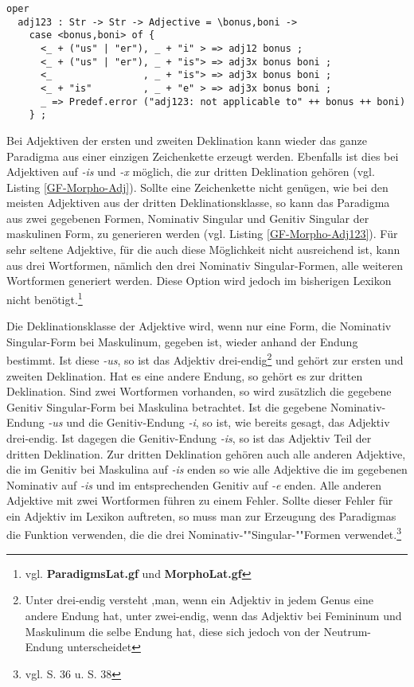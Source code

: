 \begin{lstlisting}[float=h!tp,caption={Smart Paradigm für zwei Adjektivformen (vgl. \textbf{MorphoLat.gf})},label={GF-Morpho-Adj123},basicstyle=\small]
oper
  adj123 : Str -> Str -> Adjective = \bonus,boni ->
    case <bonus,boni> of {
      <_ + ("us" | "er"), _ + "i" > => adj12 bonus ;
      <_ + ("us" | "er"), _ + "is"> => adj3x bonus boni ;
      <_                , _ + "is"> => adj3x bonus boni ;
      <_ + "is"         , _ + "e" > => adj3x bonus boni ;
      _ => Predef.error ("adj123: not applicable to" ++ bonus ++ boni)
    } ;
\end{lstlisting}
Bei Adjektiven der ersten und zweiten Deklination kann wieder das ganze Paradigma aus einer einzigen Zeichenkette erzeugt werden. Ebenfalls ist dies bei Adjektiven auf \textit{-is} und \textit{-x} möglich, die zur dritten Deklination gehören (vgl. Listing \ref{GF-Morpho-Adj}). Sollte eine Zeichenkette nicht genügen, wie bei den meisten Adjektiven aus der dritten Deklinationsklasse, so kann das Paradigma aus zwei gegebenen Formen, Nominativ Singular und Genitiv Singular der maskulinen Form, zu generieren werden (vgl. Listing \ref{GF-Morpho-Adj123}). Für sehr seltene Adjektive, für die auch diese Möglichkeit nicht ausreichend ist, kann aus drei Wortformen, nämlich den drei Nominativ Singular-Formen, alle weiteren Wortformen generiert werden. Diese Option wird jedoch im bisherigen Lexikon nicht benötigt.\footnote{vgl. \textbf{ParadigmsLat.gf} und \textbf{MorphoLat.gf}} \par
Die Deklinationsklasse der Adjektive wird, wenn nur eine Form, die Nominativ Singular-Form bei Maskulinum, gegeben ist, wieder anhand der Endung bestimmt. Ist diese \textit{-us}, so ist das Adjektiv drei-endig\footnote{Unter drei-endig versteht ,man, wenn ein Adjektiv in jedem Genus eine andere Endung hat, unter zwei-endig, wenn das Adjektiv bei Femininum und Maskulinum die selbe Endung hat, diese sich jedoch von der Neutrum-Endung unterscheidet} und gehört zur ersten und zweiten Deklination. Hat es eine andere Endung, so gehört es zur dritten Deklination. Sind zwei Wortformen vorhanden, so wird zusätzlich die gegebene Genitiv Singular-Form bei Maskulina betrachtet. Ist die gegebene Nominativ-Endung \textit{-us} und die Genitiv-Endung \textit{-i}, so ist, wie bereits gesagt, das Adjektiv drei-endig. Ist dagegen die Genitiv-Endung \textit{-is}, so ist das Adjektiv Teil der dritten Deklination. Zur dritten Deklination gehören auch alle anderen Adjektive, die im Genitiv bei Maskulina auf \textit{-is} enden so wie alle Adjektive die im gegebenen Nominativ auf \textit{-is} und im entsprechenden Genitiv auf \textit{-e} enden. Alle anderen Adjektive mit zwei Wortformen führen zu einem Fehler. Sollte dieser Fehler für ein Adjektiv im Lexikon auftreten, so muss man zur Erzeugung des Paradigmas die Funktion verwenden, die die drei Nominativ-""Singular-""Formen verwendet.\footnote{vgl. \cite{BAYER-LINDAUER1994} S. 36 u. S. 38} \par
